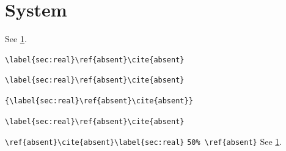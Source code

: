 \section{System}\label{sec:real}
See \ref{sec:real}.
\begin{verbatim}
\label{sec:real}\ref{absent}\cite{absent}
\end{verbatim}
\begin{Verbatim}
\label{sec:real}\ref{absent}\cite{absent}
\end{Verbatim}
\begin{lstlisting}
{\label{sec:real}\ref{absent}\cite{absent}}
\end{lstlisting}
\begin{verbatim}
\label{sec:real}\ref{absent}\cite{absent}
\end{verbatim}

\verb|\ref{absent}\cite{absent}\label{sec:real}|
\verb*+50% \ref{absent}+ See \ref{sec:real}.
\iffalse
\label{sec:real}\ref{absent}\cite{absent}

\fi
\nocite{*}
